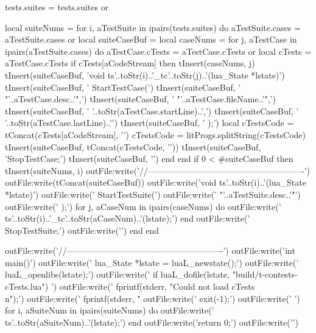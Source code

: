   tests.suites = tests.suites or { }

  local suiteNums = { }
  for i, aTestSuite in ipairs(tests.suites) do
    aTestSuite.cases = aTestSuite.cases or { }
    local suiteCaseBuf = { }
    local caseNums     = { }
    for j, aTestCase in ipairs(aTestSuite.cases) do
      aTestCase.cTests = aTestCase.cTests or { }
      local cTests     = aTestCase.cTests
      if cTests[aCodeStream] then
        tInsert(caseNums, j)
        tInsert(suiteCaseBuf, 'void ts'..toStr(i)..'_tc'..toStr(j)..'(lua_State *lstate){\n\n')
        tInsert(suiteCaseBuf, '  StartTestCase(\n')
        tInsert(suiteCaseBuf, '    "'..aTestCase.desc..'",\n')
        tInsert(suiteCaseBuf, '    "'..aTestCase.fileName..'",\n')
        tInsert(suiteCaseBuf, '    '..toStr(aTestCase.startLine)..',\n')
        tInsert(suiteCaseBuf, '    '..toStr(aTestCase.lastLine)..'\n')
        tInsert(suiteCaseBuf, '  );\n\n  ')
        local cTestsCode = tConcat(cTests[aCodeStream], '\n')
        cTestsCode       = litProgs.splitString(cTestsCode)
        tInsert(suiteCaseBuf, tConcat(cTestsCode, '\n\n  '))
        tInsert(suiteCaseBuf, '\n\n  StopTestCase;\n\n')
        tInsert(suiteCaseBuf, '}\n\n')
      end
    end
    if 0 < #suiteCaseBuf then
      tInsert(suiteNums, i)
      outFile:write('//-------------------------------------------------------\n')
      outFile:write(tConcat(suiteCaseBuf))
      outFile:write('void ts'..toStr(i)..'(lua_State *lstate){\n\n')
      outFile:write('  StartTestSuite(\n')
      outFile:write('    "'..aTestSuite.desc..'"\n')
      outFile:write('  );\n\n')
      for j, aCaseNum in ipairs(caseNums) do
        outFile:write('  ts'..toStr(i)..'_tc'..toStr(aCaseNum)..'(lstate);\n\n')
      end
      outFile:write('  StopTestSuite;\n\n')
      outFile:write('}\n\n')
    end
  end

  outFile:write('//-------------------------------------------------------\n')
  outFile:write('int main(){\n\n')
  outFile:write('  lua_State *lstate = luaL_newstate();\n')
  outFile:write('  luaL_openlibs(lstate);\n')
  outFile:write('  if luaL_dofile(lstate, "build/t-contests-cTests.lua") {\n')
  outFile:write('    fprintf(stderr, "Could not load cTests\\n");\n')
  outFile:write('    fprintf(stderr, "%
  outFile:write('    exit(-1);\n')
  outFile:write('  }\n\n')
  for i, aSuiteNum in ipairs(suiteNums) do
    outFile:write('  ts'..toStr(aSuiteNum)..'(lstate);\n')
  end
  outFile:write('\n  return 0;\n')
  outFile:write('}\n')

